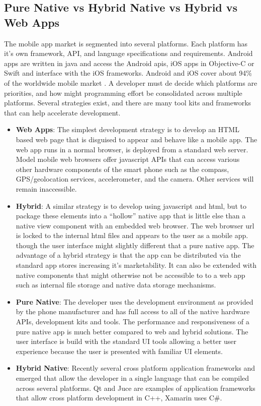 \subsection{Pure Native vs Hybrid Native vs Hybrid vs Web Apps}

The mobile app market is segmented into several platforms. Each platform has it’s own framework, API, and language specifications and requirements. Android apps are written in java and access the Android apis, iOS apps in Objective-C or Swift and interface with the iOS frameworks. Android and iOS cover about 94\% of the worldwide mobile market \cite{mobile_market}. A developer must de decide which platforms are priorities, and how might programming effort be consolidated across multiple platforms. Several strategies exist, and there are many tool kits and frameworks that can help accelerate development.


\begin{itemize}[label={}]

\item \textbf{Web Apps}: The simplest development strategy is to develop an HTML based web page that is disguised to appear and behave like a mobile app. The web app runs in a normal browser, is deployed from a standard web server. Model mobile web browsers offer javascript APIs that can access various other hardware components of the smart phone such as the compass, GPS/geolocation services, accelerometer, and the camera. Other services will remain inaccessible.

\item \textbf{Hybrid}: A similar strategy is to develop using javascript and html, but to package these elements into a “hollow” native app that is little else than a native view component with an embedded web browser. The web browser url is locked to the internal html files and appears to the user as a mobile app. though the user interface might slightly different that a pure native app. The advantage of a hybrid strategy is that the app can be distributed via the standard app stores increasing it’s marketability. It can also be extended with native components that might otherwise not be accessible to to a web app such as internal file storage and native data storage mechanisms.


\item \textbf{Pure Native}: The developer uses the development environment as provided by the phone manufacturer and has full access to all of the native hardware APIs, development kits and tools. The performance and responsiveness of a pure native app is much better compared to web and hybrid solutions. The user interface is build with the standard UI tools allowing a better user experience because the user is presented with familiar UI elements.


\item \textbf{Hybrid Native}: Recently several cross platform application frameworks and emerged that allow the developer in a single language that can be compiled across several platforms. Qt and Juce are examples of application frameworks that allow cross platform development in C++, Xamarin uses C\#.



\end{itemize}